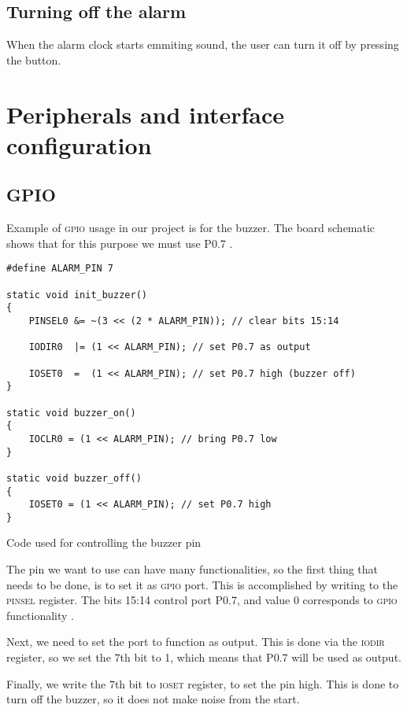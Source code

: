 \documentclass[10pt]{article}
\begin{document}
\subsection{Turning off the alarm}
When the alarm clock starts emmiting sound, the user can turn it off by pressing the button.

\section{Peripherals and interface configuration}
    
\subsection{GPIO}
Example of \textsc{gpio} usage in our project is for the buzzer. 
The board schematic shows that for this purpose we must use {\small P0.7} \mbox{\cite[p.9]{eduboard-man}}.

\begin{program}
	\begin{lstlisting}
#define ALARM_PIN 7

static void init_buzzer()
{
    PINSEL0 &= ~(3 << (2 * ALARM_PIN)); // clear bits 15:14

    IODIR0  |= (1 << ALARM_PIN); // set P0.7 as output

    IOSET0  =  (1 << ALARM_PIN); // set P0.7 high (buzzer off)
}

static void buzzer_on()
{
    IOCLR0 = (1 << ALARM_PIN); // bring P0.7 low
}

static void buzzer_off()
{
    IOSET0 = (1 << ALARM_PIN); // set P0.7 high
}
	\end{lstlisting}
	\caption{Code used for controlling the buzzer pin}
\end{program}

The pin we want to use can have many functionalities, so the first thing that needs to be done, is to set it as \textsc{gpio} port.
This is accomplished by writing to the \textsc{pinsel} register. The bits 15:14 control port {\small P0.7}, and value 0 corresponds to \textsc{gpio} functionality \cite[p.59]{lpc2148-manual}.
    
Next, we need to set the port to function as output. This is done via the \textsc{iodir} register, so we set the 7th bit to 1, which means that {\small P0.7} will be used as output.

Finally, we write the 7th bit to \textsc{ioset} register, to set the pin high. 
This is done to turn off the buzzer, so it does not make noise from the start.
\end{document}
